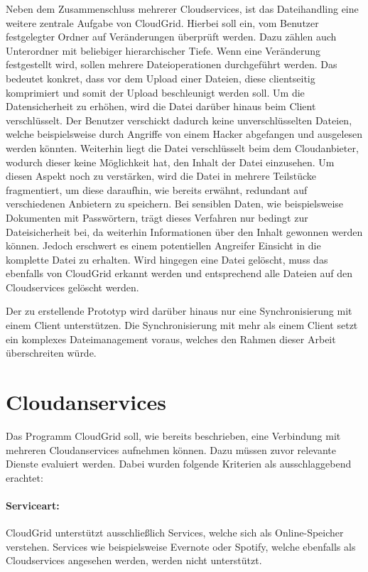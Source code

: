 Neben dem Zusammenschluss mehrerer Cloudservices, ist das Dateihandling eine weitere zentrale Aufgabe von CloudGrid.
Hierbei soll ein, vom Benutzer festgelegter Ordner auf Veränderungen überprüft werden.
Dazu zählen auch Unterordner mit beliebiger hierarchischer Tiefe.
Wenn eine Veränderung festgestellt wird, sollen mehrere Dateioperationen durchgeführt werden.
Das bedeutet konkret, dass vor dem Upload einer Dateien, diese clientseitig komprimiert und somit der Upload beschleunigt werden soll.
Um die Datensicherheit zu erhöhen, wird die Datei darüber hinaus beim Client verschlüsselt.
Der Benutzer verschickt dadurch keine unverschlüsselten Dateien, welche beispielsweise durch Angriffe von einem Hacker abgefangen und ausgelesen werden könnten.
Weiterhin liegt die Datei verschlüsselt beim dem Cloudanbieter, wodurch dieser keine Möglichkeit hat, den Inhalt der Datei einzusehen.
Um diesen Aspekt noch zu verstärken, wird die Datei in mehrere Teilstücke fragmentiert, um diese daraufhin, wie bereits erwähnt, redundant auf verschiedenen Anbietern zu speichern.
Bei sensiblen Daten, wie beispielsweise Dokumenten mit Passwörtern, trägt dieses Verfahren nur bedingt zur Dateisicherheit bei, da weiterhin Informationen über den Inhalt gewonnen werden können.
Jedoch erschwert es einem potentiellen Angreifer Einsicht in die komplette Datei zu erhalten.
Wird hingegen eine Datei gelöscht, muss das ebenfalls von CloudGrid erkannt werden und entsprechend alle Dateien auf den Cloudservices gelöscht werden.

Der zu erstellende Prototyp wird darüber hinaus nur eine Synchronisierung mit einem Client unterstützen.
Die Synchronisierung mit mehr als einem Client setzt ein komplexes Dateimanagement voraus, welches den Rahmen dieser Arbeit überschreiten würde.

\section{Cloudanservices}
\label{anfoderungcloudanbieter}
Das Programm CloudGrid soll, wie bereits beschrieben, eine Verbindung mit mehreren Cloudanservices aufnehmen können.
Dazu müssen zuvor relevante Dienste evaluiert werden.
Dabei wurden folgende Kriterien als ausschlaggebend erachtet:
\paragraph{Serviceart:} CloudGrid unterstützt ausschließlich Services, welche sich als Online-Speicher verstehen.
Services wie beispielsweise Evernote oder Spotify, welche ebenfalls als Cloudservices angesehen werden, werden nicht unterstützt.
